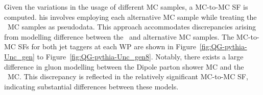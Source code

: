 Given the variations in the usage of different MC samples, a MC-to-MC SF is computed. his involves employing each alternative MC sample while treating the \pythia~MC samples as pseudodata. This approach accommodates discrepancies arising from modelling difference between the \pythia~and alternative MC samples. The MC-to-MC SFs for both jet taggers at each WP are shown in Figure~\ref{fig:QG-pythia-Unc_gen} to Figure~\ref{fig:QG-pythia-Unc_gen8}. Notably, there exists a large difference in gluon modelling between the \herwig Dipole parton shower MC and the \pythia~MC. This discrepancy is reflected in the relatively significant MC-to-MC SF, indicating substantial differences between these models.


\begin{figure}[htbp]
	\centering
	\quad
	\\
	\quad

\end{figure}
